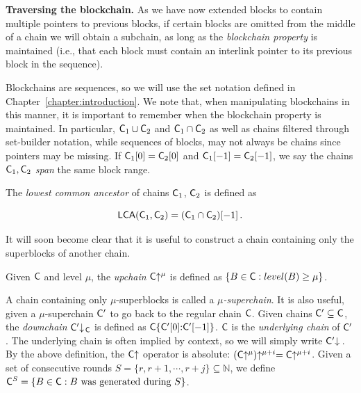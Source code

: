 

\noindent\textbf{Traversing the blockchain. }
As we have now extended blocks to contain multiple pointers to previous blocks,
if certain blocks are omitted from the middle of a chain we will obtain a
subchain, as long as the \emph{blockchain property} is maintained (i.e., that
each block must contain an interlink pointer to its previous block in the
sequence).

Blockchains are sequences, so we will use the set notation defined in
Chapter~\ref{chapter:introduction}. We note that, when manipulating blockchains
in this manner, it is important to remember when the blockchain property is
maintained. In particular, $\mathsf{C}_1 \cup \mathsf{C}_2$ and $\mathsf{C}_1 \cap \mathsf{C}_2$
as well as chains filtered through set-builder notation,
while sequences of blocks, may not always be chains since pointers may be missing.
If $\mathsf{C}_1[0] = \mathsf{C}_2[0]$ and $\mathsf{C}_1[-1]
= \mathsf{C}_2[-1]$, we say the chains $\mathsf{C}_1, \mathsf{C}_2$ \emph{span} the same
block range.

\begin{definition}
The \emph{lowest common ancestor} of chains $\mathsf{C}_1$, $\mathsf{C}_2$ is defined as

\[
\textsf{LCA}(\mathsf{C}_1, \mathsf{C}_2) = (\mathsf{C}_1 \cap \mathsf{C}_2)[-1]\,.
\]
\end{definition}

It will soon become clear that it is useful to construct a chain containing only
the superblocks of another chain.

\begin{definition}[Upchain]
Given $\mathsf{C}$ and level $\mu$, the \emph{upchain} $\mathsf{C}\negthickspace\uparrow^\mu$ is
defined as $\{B \in \mathsf{C}: level(B) \geq \mu\}$.
\end{definition}

A chain containing only $\mu$-superblocks is called a
$\mu$\emph{-superchain}. It is also useful, given a $\mu$-superchain $\mathsf{C}'$
to go back to the regular chain $\mathsf{C}$. Given chains $\mathsf{C}' \subseteq
\mathsf{C}$, the \emph{downchain} $\mathsf{C}'\negthickspace\downarrow\,\!\!_{\mathsf{C}}$ is defined as
$\mathsf{C}\{\mathsf{C}'[0]{:}\mathsf{C}'[-1]\}$. $\mathsf{C}$ is the \emph{underlying chain} of
$\mathsf{C}'$. The underlying chain is often implied by context, so we will simply
write $\mathsf{C}'\negthickspace\downarrow\,$. By the above definition, the $\mathsf{C}\negthickspace\uparrow$
operator is absolute: $(\mathsf{C}\negthickspace\uparrow^\mu)\negthickspace\uparrow^{\mu + i} =
\mathsf{C}\negthickspace\uparrow^{\mu + i}$. Given a set of consecutive rounds $S = \{r, r + 1,
\cdots, r + j\} \subseteq \mathbb{N}$, we define $\mathsf{C}^S = \{B \in \mathsf{C}: B
\text{ was generated during } S\}$.

